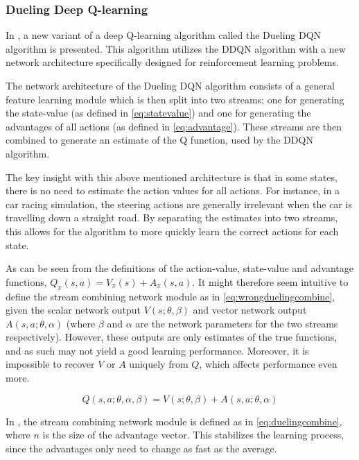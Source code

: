 \documentclass{kththesis}
\begin{document}
\subsubsection{Dueling Deep Q-learning}
In \textcite{wang2015dueling}, a new variant of a deep Q-learning algorithm called the Dueling DQN algorithm is presented. This algorithm utilizes the DDQN algorithm with a new network architecture specifically designed for reinforcement learning problems. 

The network architecture of the Dueling DQN algorithm consists of a general feature learning module which is then split into two streams; one for generating the state-value (as defined in \autoref{eq:statevalue}) and one for generating the advantages of all actions (as defined in \autoref{eq:advantage}). These streams are then combined to generate an estimate of the Q function, used by the DDQN algorithm.

The key insight with this above mentioned architecture is that in some states, there is no need to estimate the action values for all actions. For instance, in a car racing simulation, the steering actions are generally irrelevant when the car is travelling down a straight road. By separating the estimates into two streams, this allows for the algorithm to more quickly learn the correct actions for each state. \parencite{wang2015dueling}

As can be seen from the definitions of the action-value, state-value and advantage functions, $Q_\pi(s, a) = V_\pi(s) + A_\pi(s, a)$. It might therefore seem intuitive to define the stream combining network module as in \autoref{eq:wrongduelingcombine}, given the scalar network output $V(s;\theta,\beta)$ and vector network output $A(s, a;\theta, \alpha)$ (where $\beta$ and $\alpha$ are the network parameters for the two streams respectively). However, these outputs are only estimates of the true functions, and as such may not yield a good learning performance. Moreover, it is impossible to recover $V$ or $A$ uniquely from $Q$, which affects performance even more. \parencite{wang2015dueling}

\begin{equation}
\label{eq:wrongduelingcombine}
Q(s,a;\theta,\alpha,\beta) = V(s;\theta,\beta) + A(s, a;\theta, \alpha)
\end{equation}

In \textcite{wang2015dueling}, the stream combining network module is defined as in \autoref{eq:duelingcombine}, where $n$ is the size of the advantage vector. This stabilizes the learning process, since the advantages only need to change as fast as the average. 
\end{document}
